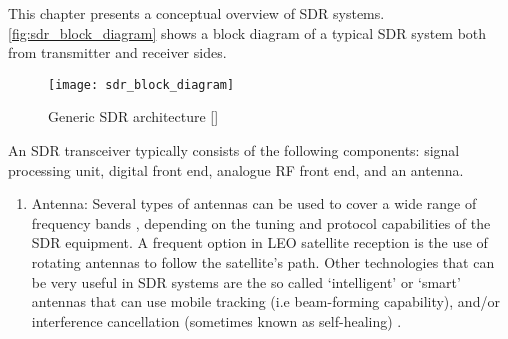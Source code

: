This chapter presents a conceptual overview of SDR systems. \autoref{fig:sdr_block_diagram} shows a block diagram of a typical SDR system both from transmitter and receiver sides.
\begin{figure}[ht]
  \centering
  \texttt{[image: sdr\_block\_diagram]}
  \caption{Generic SDR architecture [\citeauthor{DBLP:journals/corr/abs-1804-06564}]}
  \label{fig:sdr_block_diagram}
\end{figure}

An SDR transceiver typically consists of the following components: signal processing unit, digital front end, analogue RF front end, and an antenna.
\begin{enumerate}
  \item Antenna: Several types of antennas can be used to cover a wide range of frequency bands \cite{communications_receivers}, depending on the tuning and protocol capabilities of the SDR equipment. A frequent option in LEO satellite reception is the use of rotating antennas to follow the satellite's path. Other technologies that can be very useful in SDR systems are the so called `intelligent' or `smart' antennas that can use mobile tracking (i.e beam-forming capability), and/or interference cancellation (sometimes known as self-healing) \cite{rf_dig_sig_processing} \cite{review_tech_sdr}.


\end{enumerate}
